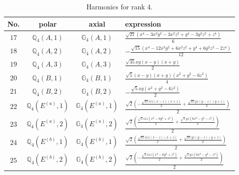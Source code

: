 \documentclass[fleqn,8pt,landscape]{jsarticle}
\begin{document}
\begin{table}[ht!]
\begin{center}
\caption{Harmonics for rank 4.}
\renewcommand{\arraystretch}{1.3}
\begin{tabular}{cccl} \hline \hline
No. & polar & axial & expression \\ \hline
$ 17 $ & $ \mathbb{Q}_{4}(A,1) $ & $ \mathbb{G}_{4}(A,1) $ & $ \frac{\sqrt{21} \left(x^{4} - 3 x^{2} y^{2} - 3 x^{2} z^{2} + y^{4} - 3 y^{2} z^{2} + z^{4}\right)}{6} $ \\
$ 18 $ & $ \mathbb{Q}_{4}(A,2) $ & $ \mathbb{G}_{4}(A,2) $ & $ - \frac{\sqrt{15} \left(x^{4} - 12 x^{2} y^{2} + 6 x^{2} z^{2} + y^{4} + 6 y^{2} z^{2} - 2 z^{4}\right)}{12} $ \\
$ 19 $ & $ \mathbb{Q}_{4}(A,3) $ & $ \mathbb{G}_{4}(A,3) $ & $ \frac{\sqrt{35} x y \left(x - y\right) \left(x + y\right)}{2} $ \\
$ 20 $ & $ \mathbb{Q}_{4}(B,1) $ & $ \mathbb{G}_{4}(B,1) $ & $ \frac{\sqrt{5} \left(x - y\right) \left(x + y\right) \left(x^{2} + y^{2} - 6 z^{2}\right)}{4} $ \\
$ 21 $ & $ \mathbb{Q}_{4}(B,2) $ & $ \mathbb{G}_{4}(B,2) $ & $ - \frac{\sqrt{5} x y \left(x^{2} + y^{2} - 6 z^{2}\right)}{2} $ \\
$ 22 $ & $ \mathbb{Q}_{4}(E^{(a)},1) $ & $ \mathbb{G}_{4}(E^{(a)},1) $ & $ \frac{\sqrt{2} \left(- \frac{\sqrt{35} i x z \left(x - z\right) \left(x + z\right)}{2} + \frac{\sqrt{35} y z \left(y - z\right) \left(y + z\right)}{2}\right)}{2} $ \\
$ 23 $ & $ \mathbb{Q}_{4}(E^{(a)},2) $ & $ \mathbb{G}_{4}(E^{(a)},2) $ & $ \frac{\sqrt{2} \left(\frac{\sqrt{5} i x z \left(x^{2} - 6 y^{2} + z^{2}\right)}{2} + \frac{\sqrt{5} y z \left(6 x^{2} - y^{2} - z^{2}\right)}{2}\right)}{2} $ \\
$ 24 $ & $ \mathbb{Q}_{4}(E^{(b)},1) $ & $ \mathbb{G}_{4}(E^{(b)},1) $ & $ \frac{\sqrt{2} \left(\frac{\sqrt{35} i x z \left(x - z\right) \left(x + z\right)}{2} + \frac{\sqrt{35} y z \left(y - z\right) \left(y + z\right)}{2}\right)}{2} $ \\
$ 25 $ & $ \mathbb{Q}_{4}(E^{(b)},2) $ & $ \mathbb{G}_{4}(E^{(b)},2) $ & $ \frac{\sqrt{2} \left(- \frac{\sqrt{5} i x z \left(x^{2} - 6 y^{2} + z^{2}\right)}{2} + \frac{\sqrt{5} y z \left(6 x^{2} - y^{2} - z^{2}\right)}{2}\right)}{2} $ \\
 \hline \hline
\end{tabular}
\end{center}
\end{table}
\end{document}
